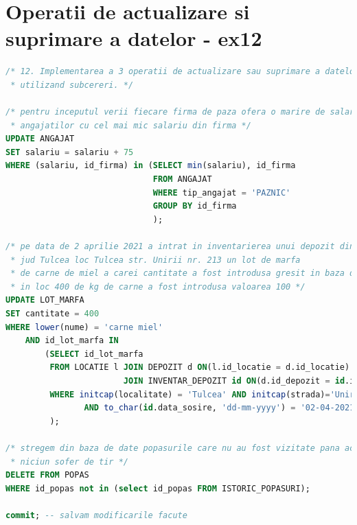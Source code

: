 \documentclass[12pt, a4paper]{article}
\begin{document}
\newpage
\section{Operatii de actualizare si \\suprimare a datelor - ex12}
\begin{lstlisting}[language=SQL]
/* 12. Implementarea a 3 operatii de actualizare sau suprimare a datelor
 * utilizand subcereri. */

/* pentru inceputul verii fiecare firma de paza ofera o marire de salariu cu 75lei
 * angajatilor cu cel mai mic salariu din firma */
UPDATE ANGAJAT
SET salariu = salariu + 75
WHERE (salariu, id_firma) in (SELECT min(salariu), id_firma
                              FROM ANGAJAT
                              WHERE tip_angajat = 'PAZNIC'
                              GROUP BY id_firma
                              );

/* pe data de 2 aprilie 2021 a intrat in inventarierea unui depozit din
 * jud Tulcea loc Tulcea str. Unirii nr. 213 un lot de marfa
 * de carne de miel a carei cantitate a fost introdusa gresit in baza de date,
 * in loc 400 de kg de carne a fost introdusa valoarea 100 */
UPDATE LOT_MARFA
SET cantitate = 400
WHERE lower(nume) = 'carne miel'
    AND id_lot_marfa IN
        (SELECT id_lot_marfa
         FROM LOCATIE l JOIN DEPOZIT d ON(l.id_locatie = d.id_locatie)
                        JOIN INVENTAR_DEPOZIT id ON(d.id_depozit = id.id_depozit)
         WHERE initcap(localitate) = 'Tulcea' AND initcap(strada)='Unirii' AND nr = 213
                AND to_char(id.data_sosire, 'dd-mm-yyyy') = '02-04-2021'
         );

/* stregem din baza de date popasurile care nu au fost vizitate pana acum de
 * niciun sofer de tir */
DELETE FROM POPAS
WHERE id_popas not in (select id_popas FROM ISTORIC_POPASURI);

commit; -- salvam modificarile facute
\end{lstlisting}

\newpage
\end{document}
